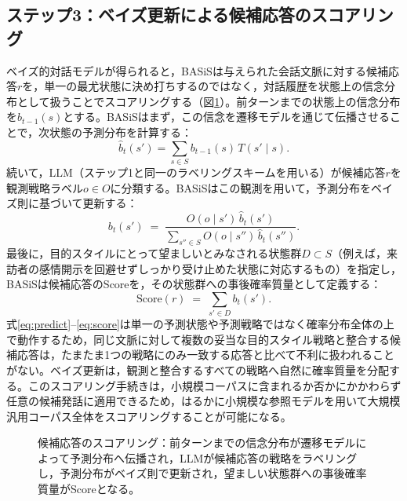 \documentclass[manuscript,review,anonymous]{acmart}
\begin{document}
\subsection{ステップ3：ベイズ更新による候補応答のスコアリング}
\label{sec:scoring}
ベイズ的対話モデルが得られると，BASiSは与えられた会話文脈に対する候補応答$r$を，単一の最尤状態に決め打ちするのではなく，対話履歴を状態上の信念分布として扱うことでスコアリングする（図\ref{fig:scoring}）。前ターンまでの状態上の信念分布を$b_{t-1}(s)$とする。BASiSはまず，この信念を遷移モデルを通じて伝播させることで，次状態の予測分布を計算する：
\begin{equation}
  \hat{b}_t(s') = \sum_{s \in S} b_{t-1}(s)\, T(s' \mid s).
  \label{eq:predict}
\end{equation}
続いて，LLM（ステップ1と同一のラベリングスキームを用いる）が候補応答$r$を観測戦略ラベル$o\in O$に分類する。BASiSはこの観測を用いて，予測分布をベイズ則に基づいて更新する：
\begin{equation}
  b_t(s') \;=\; \frac{O(o \mid s')\, \hat{b}_t(s')}{\displaystyle\sum_{s'' \in S} O(o \mid s'')\, \hat{b}_t(s'')}.
  \label{eq:update}
\end{equation}
最後に，目的スタイルにとって望ましいとみなされる状態群$D\subset S$（例えば，来訪者の感情開示を回避せずしっかり受け止めた状態に対応するもの）を指定し，BASiSは候補応答のScoreを，その状態群への事後確率質量として定義する：
\begin{equation}
  \mathrm{Score}(r) \;=\; \sum_{s' \in D} b_t(s').
  \label{eq:score}
\end{equation}
式\eqref{eq:predict}--\eqref{eq:score}は単一の予測状態や予測戦略ではなく確率分布全体の上で動作するため，同じ文脈に対して複数の妥当な目的スタイル戦略と整合する候補応答は，たまたま1つの戦略にのみ一致する応答と比べて不利に扱われることがない。ベイズ更新は，観測と整合するすべての戦略へ自然に確率質量を分配する。このスコアリング手続きは，小規模コーパスに含まれるか否かにかかわらず任意の候補発話に適用できるため，はるかに小規模な参照モデルを用いて大規模汎用コーパス全体をスコアリングすることが可能になる。

\begin{figure}[t]
  \centering
  \caption{候補応答のスコアリング：前ターンまでの信念分布が遷移モデルによって予測分布へ伝播され，LLMが候補応答の戦略をラベリングし，予測分布がベイズ則で更新され，望ましい状態群への事後確率質量がScoreとなる。}
  \label{fig:scoring}
\end{figure}
\end{document}
